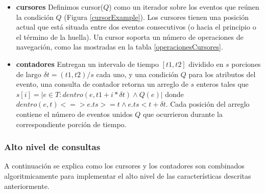 \documentclass[12pt,legalpaper]{report}
\begin{document}
\begin{itemize}
	\item \textbf{cursores} Definimos cursor($Q$) como un iterador sobre los eventos que reúnen la condición $Q$ (Figura \ref{cursorExample}).  Los cursores tienen una posición actual que está situada entre dos eventos consecutivos (o hacia el principio o el término de la huella).  Un cursor soporta un número de operaciones de navegación, como las mostradas en la tabla \ref{operacionesCursores}.

	\item \textbf{contadores} Entregan un intervalo de tiempo $[t1,t2]$ dividido en $s$ porciones de largo $\delta t = (t1,t2)/s$ cada uno, y una condición $Q$ para los atributos del evento, una consulta de contador retorna un arreglo de $s$ enteros tales que $s[i] = | {e \in T: dentro(e, t1 + i*\delta t) \wedge Q(e)} |$ donde $dentro(e,t) < = > e.ts > = t  \wedge e.ts < t + \delta t$.   Cada posición del arreglo contiene el número de eventos unidos $Q$ que ocurrieron durante la correspondiente porción de tiempo.
\end{itemize}

			\subsubsection{Alto nivel de consultas}

A continuación se explica como los cursores y los contadores son combinados algoritmicamente para implementar el alto nivel de las características descritas anteriormente.
\end{document}
